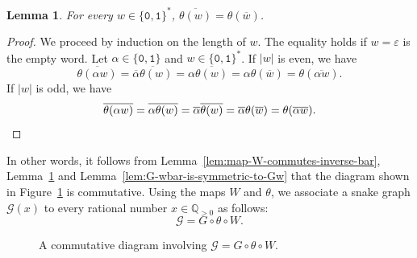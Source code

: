 \documentclass[a4paper,12pt]{amsart}
\newtheorem{lemma}[definition]{Lemma}
\newcommand{\Q}{\mathbb{Q}}
\newcommand{\xx}{{x}}
\newcommand{\Gcal}{{\mathcal{G}}}
\newcommand{\0}{\mathtt{0}}
\newcommand{\1}{\mathtt{1}}
\newcommand{\2}{\mathtt{2}}
\newcommand{\3}{\mathtt{3}}
\begin{document}
\begin{lemma} \label{lem:map-theta-commutes-bar-bar}
    For every $w\in\{\0,\1\}^*$, $\overline{\theta(w)}=\theta(\overline{w})$.
\end{lemma}

\begin{proof}
    We proceed by induction on the length of $w$.
    The equality holds if $w=\varepsilon$ is the empty word.
    Let $\alpha\in\{\0,\1\}$ and $w\in\{\0,\1\}^*$.
    If $|w|$ is even, we have
    \[
        \overline{\theta(\alpha w)}
        = \overline{\overline{\alpha} \theta(w)}
        = \alpha \overline{\theta(w)}
        = \alpha \theta(\overline{w})
        =\theta(\overline{\alpha w}).
    \]
    If $|w|$ is odd, we have
    \[
        \overline{\theta(\alpha w)}
        = \overline{\alpha \theta(w)}
        = \overline{\alpha} \overline{\theta(w)}
        = \overline{\alpha} \theta(\overline{w})
        =\theta(\overline{\alpha w}).\qedhere
    \]
\end{proof}

    In other words, it follows from
    Lemma~\ref{lem:map-W-commutes-inverse-bar},
    Lemma~\ref{lem:map-theta-commutes-bar-bar} and
    Lemma~\ref{lem:G-wbar-is-symmetric-to-Gw}
    that the diagram shown in Figure~\ref{fig:commutative-Gcal}
    is commutative.
Using the maps $W$ and $\theta$, we associate
a snake graph $\Gcal(\xx)$
to every rational number $\xx\in\Q_{>0}$
as follows:
\begin{equation}
\Gcal = G\circ \theta\circ W.
\end{equation}

\begin{figure}[h]
\begin{center}
\end{center}
    \caption{A commutative diagram involving $\Gcal = G\circ \theta\circ W$.}
    \label{fig:commutative-Gcal}
\end{figure}
\end{document}
